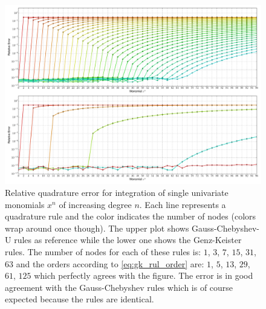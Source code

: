 \documentclass[a4paper,10pt]{article}
\begin{document}
\begin{figure}
  \centering
  \includegraphics[width=\linewidth]{./img/monomial_errors_chebyshevu.pdf}
  \caption{Relative quadrature error for integration of single univariate monomials $x^n$ of increasing degree $n$.
  Each line represents a quadrature rule and the color indicates the number of nodes (colors wrap around once though).
  The upper plot shows Gauss-Chebyshev-U rules as reference while the lower one shows the Genz-Keister rules.
  The number of nodes for each of these rules is:
  $1$, $3$,  $7$, $15$, $31$,  $63$ and the orders according to \eqref{eq:gk_rul_order} are:
  $1$, $5$, $13$, $29$, $61$, $125$ which perfectly agrees with the figure.
  The error is in good agreement with the Gauss-Chebyshev rules which is of course
  expected because the rules are identical.}
  \label{fig:monomial_errors_chebyshevu}
\end{figure}
\end{document}
